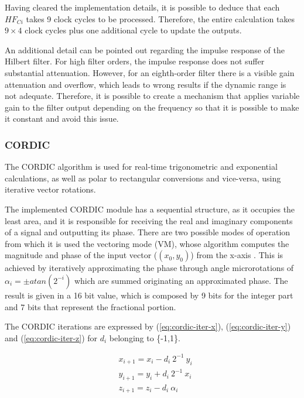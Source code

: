 Having cleared the implementation details, it is possible to deduce that each $HF_{Ci}$ takes 9 clock cycles to be processed. Therefore, the entire calculation takes $9 \times 4$ clock cycles plus one additional cycle to update the outputs.

An additional detail can be pointed out regarding the impulse response of the Hilbert filter. For high filter orders, the impulse response does not suffer substantial attenuation. However, for an eighth-order filter there is a visible gain attenuation and overflow, which leads to wrong results if the dynamic range is not adequate. Therefore, it is possible to create a mechanism that applies variable gain to the filter output depending on the frequency so that it is possible to make it constant and avoid this issue.

\subsubsection{CORDIC}

The CORDIC algorithm is used for real-time trigonometric and exponential calculations, as well as polar to rectangular conversions and vice-versa, using iterative vector rotations. 

The implemented CORDIC module has a sequential structure, as it occupies the least area, and it is responsible for receiving the real and imaginary components of a signal and outputting its phase. There are two possible modes of operation from which it is used the vectoring mode (VM), whose algorithm computes the magnitude and phase of the input vector ($(x_0, y_0)$) from the x-axis \cite{cordic-def}. This is achieved by iteratively approximating the phase through angle microrotations of $\alpha_i = \pm atan(2^{-i})$ which are summed originating an approximated phase. The result is given in a 16 bit value, which is composed by 9 bits for the integer part and 7 bits that represent the fractional portion. 

The CORDIC iterations are expressed by (\ref{eq:cordic-iter-x}), (\ref{eq:cordic-iter-y}) and (\ref{eq:cordic-iter-z}) for $d_i$ belonging to \{-1,1\}.

\begin{eqnarray}
	& x_{i+1} = x_i - d_i \ 2^{-1} \ y_i
	\label{eq:cordic-iter-x}  \\
	& y_{i+1} = y_i + d_i \ 2^{-1} \ x_i
	\label{eq:cordic-iter-y} \\
	& z_{i+1} = z_i - d_i \ \alpha_i
	\label{eq:cordic-iter-z}
\end{eqnarray}

